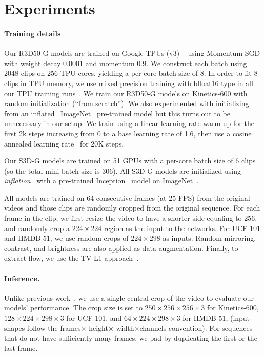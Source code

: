 \documentclass[10pt,twocolumn,letterpaper]{article}
\begin{document}
\section{Experiments}
\label{sec:experiments}
\paragraph{Training details}
Our R3D50-G models are trained on Google TPUs (v3) ~\cite{kumar2019scale} using Momentum SGD with weight decay 0.0001 and momentum 0.9.  We construct each batch using 2048 clips on 256 TPU cores, yielding a per-core batch size of 8. In order to fit 8 clips in TPU memory, we use mixed precision training with bfloat16 type in all our TPU training runs~\cite{wang2019bfloat16}. We train our R3D50-G models on Kinetics-600 with random initialization (``from scratch''). We also experimented with initializing from an inflated~\cite{carreira2017quo} ImageNet~\cite{deng2009imagenet} pre-trained model but this turns out to be unnecessary in our setup. We train using a linear learning rate warm-up for the first 2k steps increasing from 0 to a base learning rate of 1.6, then use a cosine annealed learning rate~\cite{loshchilov2016sgdr} for 20K steps. 

Our S3D-G models are trained on 51 GPUs with a per-core batch size of 6 clips (so the total mini-batch size is 306). All S3D-G models are initialized using \emph{inflation}~\cite{carreira2017quo} with a pre-trained Inception~\cite{Szegedy1} model on ImageNet~\cite{deng2009imagenet}.

All models are trained on 64 consecutive frames (at 25 FPS) from the original videos and those clips are randomly cropped from the original sequence. For each frame in the clip, we first resize the video to have a shorter side equaling to 256, and randomly crop a $224 \times 224$ region as the input to the networks. For UCF-101 and HMDB-51, we use random crops of $224\times 298$ as inputs. Random mirroring, contrast, and brightness are also applied as data augmentation. 
Finally, to extract flow, we use the TV-L1 approach~\cite{tvl1_flow}.

\paragraph{Inference.} Unlike previous work~\cite{wang2018non,feichtenhofer2019slowfast}, we use a single central crop of the video to evaluate our models' performance. The crop size is set to $250\times256\times256 \times 3$ for Kinetics-600, $128\times224\times298\times 3$ for UCF-101, and $64\times 224\times 298 \times 3$ for HMDB-51, (input shapes follow the frames$\times$ height$\times$ width$\times$channels convention). For sequences that do not have sufficiently many frames, we pad by duplicating the first or the last frame. 
\end{document}
